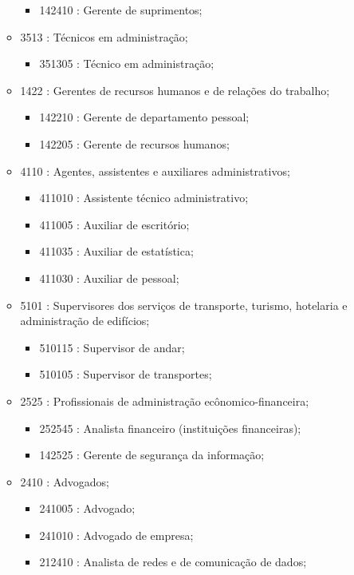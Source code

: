 \begin{itemize}
\begin{itemize}
\begin{itemize}
      \item 142410 : Gerente de suprimentos;
    \end{itemize}
    \item 3513 : Técnicos em administração;
    \begin{itemize}
      \item 351305 : Técnico em administração;
    \end{itemize}
    \item 1422 : Gerentes de recursos humanos e de relações do trabalho;
    \begin{itemize}
      \item 142210 : Gerente de departamento pessoal;
      \item 142205 : Gerente de recursos humanos;
    \end{itemize}
    \item 4110 : Agentes, assistentes e auxiliares administrativos;
    \begin{itemize}
      \item 411010 : Assistente técnico administrativo;
      \item 411005 : Auxiliar de escritório;
      \item 411035 : Auxiliar de estatística;
      \item 411030 : Auxiliar de pessoal;
    \end{itemize}
    \item 5101 : Supervisores dos serviços de transporte, turismo, hotelaria e administração de edifícios;
    \begin{itemize}
      \item 510115 : Supervisor de andar;
      \item 510105 : Supervisor de transportes;
    \end{itemize}
    \item 2525 : Profissionais de administração ecônomico-financeira;
    \begin{itemize}
      \item 252545 : Analista financeiro (instituições financeiras);
      \item 142525 : Gerente de segurança da informação;
    \end{itemize}
    \item 2410 : Advogados;
    \begin{itemize}
      \item 241005 : Advogado;
      \item 241010 : Advogado de empresa;
      \item 212410 : Analista de redes e de comunicação de dados;

\end{itemize}
\end{itemize}
\end{itemize}
